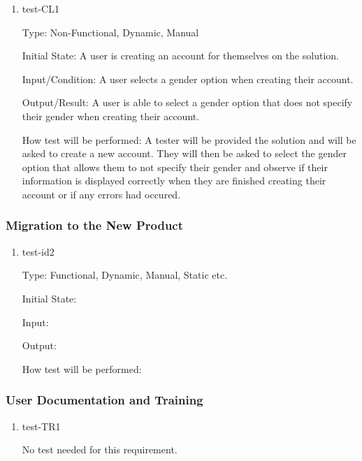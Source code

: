 \documentclass[12pt, titlepage]{article}
\begin{document}
\begin{enumerate}

  \item{test-CL1\\}
  
  Type: Non-Functional, Dynamic, Manual
            
  Initial State: A user is creating an account for themselves on the solution.
            
  Input/Condition: A user selects a gender option when creating their account.
            
  Output/Result: A user is able to select a gender option that does not specify their
  gender when creating their account.
            
  How test will be performed: A tester will be provided the solution and will be asked
  to create a new account. They will then be asked to select the gender option that allows
  them to not specify their gender and observe if their information is displayed correctly
  when they are finished creating their account or if any errors had occured.
  
\end{enumerate}

\subsubsection{Migration to the New Product}

\begin{enumerate}

  \item{test-id2\\}
  
  Type: Functional, Dynamic, Manual, Static etc.
            
  Initial State: 
            
  Input: 
            
  Output: 
            
  How test will be performed: 

\end{enumerate}

\subsubsection{User Documentation and Training}

\begin{enumerate}

  \item{test-TR1\\}

  No test needed for this requirement.

\end{enumerate}
\end{document}
